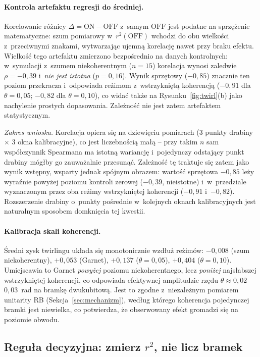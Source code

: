 \documentclass[11pt]{article}
\begin{document}
\paragraph{Kontrola artefaktu regresji do średniej.} Korelowanie różnicy $\Delta = \mathrm{ON}-\mathrm{OFF}$
z~samym $\mathrm{OFF}$ jest podatne na sprzężenie matematyczne: szum pomiarowy w~$r^2(\mathrm{OFF})$
wchodzi do obu wielkości z~przeciwnymi znakami, wytwarzając ujemną korelację nawet przy braku
efektu. Wielkość tego artefaktu zmierzono bezpośrednio na danych kontrolnych: w~symulacji z~szumem
niekoherentnym ($n=15$) korelacja wynosi zaledwie $\rho = -0{,}39$ i~\emph{nie jest istotna}
($p = 0{,}16$). Wynik sprzętowy ($-0{,}85$) znacznie ten poziom przekracza i~odpowiada reżimom
z~wstrzykniętą koherencją ($-0{,}91$ dla $\theta=0{,}05$; $-0{,}82$ dla $\theta=0{,}10$), co widać
także na Rysunku~\ref{fig:twirl}(b) jako nachylenie prostych dopasowania. Zależność nie jest zatem
artefaktem statystycznym.

\emph{Zakres wniosku.} Korelacja opiera się na dziewięciu pomiarach (3 punkty drabiny $\times$
3 okna kalibracyjne), co jest liczebnością małą -- przy takim $n$ sam współczynnik Spearmana ma
istotną wariancję i~pojedynczy odstający punkt drabiny mógłby go zauważalnie przesunąć. Zależność tę traktuje
się zatem jako wynik wstępny, wsparty jednak spójnym obrazem: wartość sprzętowa $-0{,}85$ leży
wyraźnie powyżej poziomu kontroli zerowej ($-0{,}39$, nieistotne) i~w~przedziale wyznaczonym przez
oba reżimy wstrzykniętej koherencji ($-0{,}91$ i~$-0{,}82$). Rozszerzenie drabiny o~punkty
pośrednie w~kolejnych oknach kalibracyjnych jest naturalnym sposobem domknięcia tej kwestii.

\paragraph{Kalibracja skali koherencji.} Średni zysk twirlingu układa się monotonicznie wzdłuż
reżimów: $-0{,}008$ (szum niekoherentny), $+0{,}053$ (Garnet), $+0{,}137$ ($\theta=0{,}05$),
$+0{,}404$ ($\theta=0{,}10$). Umiejscawia to Garnet \emph{powyżej} poziomu niekoherentnego, lecz
\emph{poniżej} najsłabszej wstrzykniętej koherencji, co odpowiada efektywnej amplitudzie rzędu
$\theta \approx 0{,}02$--$0{,}03$~rad na bramkę dwukubitową. Jest to zgodne z~niezależnym pomiarem
unitarity RB (Sekcja~\ref{sec:mechanizm}), według którego koherencja pojedynczej bramki jest
niewielka, co potwierdza, że obserwowany efekt gromadzi się na poziomie obwodu.

\subsection*{Reguła decyzyjna: zmierz \texorpdfstring{$r^2$}{r2}, nie licz bramek}
\end{document}

